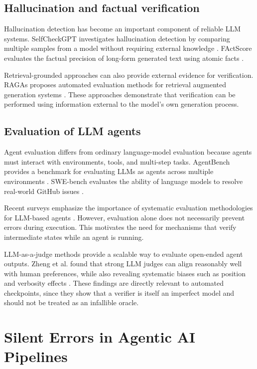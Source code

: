 \documentclass[12pt]{article}
\begin{document}
\subsection{Hallucination and factual verification}
\label{sec:factual-verification}

Hallucination detection has become an important component of reliable LLM
systems. SelfCheckGPT investigates hallucination detection by comparing multiple
samples from a model without requiring external knowledge
\cite{manakul2023selfcheckgpt}. FActScore evaluates the factual precision of
long-form generated text using atomic facts \cite{min2023factscore}.

Retrieval-grounded approaches can also provide external evidence for
verification. RAGAs proposes automated evaluation methods for retrieval
augmented generation systems \cite{es2024ragas}. These approaches demonstrate
that verification can be performed using information external to the model's
own generation process.

\subsection{Evaluation of LLM agents}
\label{sec:agent-evaluation}

Agent evaluation differs from ordinary language-model evaluation because agents
must interact with environments, tools, and multi-step tasks. AgentBench
provides a benchmark for evaluating LLMs as agents across multiple environments
\cite{liu2024agentbench}. SWE-bench evaluates the ability of language models to
resolve real-world GitHub issues \cite{jimenez2024swebench}.

Recent surveys emphasize the importance of systematic evaluation methodologies
for LLM-based agents \cite{mohammadi2025evaluation,yehudai2026survey}. However,
evaluation alone does not necessarily prevent errors during execution. This
motivates the need for mechanisms that verify intermediate states while an agent
is running.

LLM-as-a-judge methods provide a scalable way to evaluate open-ended agent
outputs. Zheng et al. found that strong LLM judges can align reasonably well
with human preferences, while also revealing systematic biases such as
position and verbosity effects \cite{zheng2023judge}. These findings are
directly relevant to automated checkpoints, since they show that a verifier is
itself an imperfect model and should not be treated as an infallible oracle.

\section{Silent Errors in Agentic AI Pipelines}
\label{sec:silent-errors}
\end{document}
